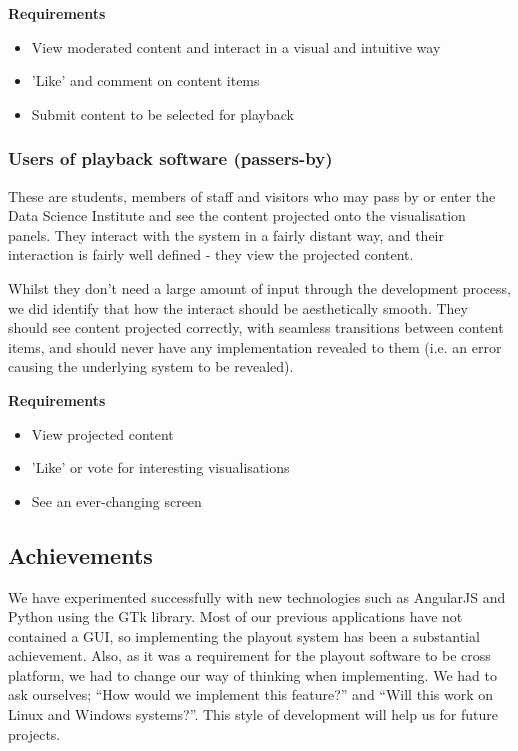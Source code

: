 \documentclass[a4paper, titlepage]{article}
\begin{document}
\textbf{Requirements}
\begin{itemize}
\item View moderated content and interact in a visual and intuitive way
\item 'Like' and comment on content items
\item Submit content to be selected for playback
\end{itemize}

\subsubsection{Users of playback software (passers-by)}

These are students, members of staff and visitors who may pass by or enter the Data Science Institute and see the content projected onto the visualisation panels. They interact with the system in a fairly distant way, and their interaction is fairly well defined - they view the projected content.

Whilst they don't need a large amount of input through the development process, we did identify that how the interact should be aesthetically smooth. They should see content projected correctly, with seamless transitions between content items, and should never have any implementation revealed to them (i.e. an error causing the underlying system to be revealed).

\textbf{Requirements}
\begin{itemize}
\item View projected content
\item 'Like' or vote for interesting visualisations
\item See an ever-changing screen
\end{itemize}


\subsection{Achievements}
We have experimented successfully with new technologies such as AngularJS and Python using the GTk 
library. Most of our previous applications have not contained a GUI, so implementing the playout
system has been a substantial achievement. Also, as it was a requirement for the playout software 
to be cross platform, we had to change our way of thinking when implementing. We had to ask ourselves;
``How would we implement this feature?'' and ``Will this work on Linux and Windows systems?''. This style
of development will help us for future projects.
\end{document}
